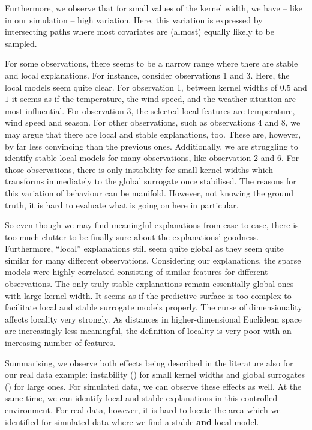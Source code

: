 \documentclass[]{krantz}
\begin{document}
Furthermore, we observe that for small values of the kernel width, we
have -- like in our simulation -- high variation. Here, this variation
is expressed by intersecting paths where most covariates are (almost)
equally likely to be sampled.

For some observations, there seems to be a narrow range where there are
stable and local explanations. For instance, consider observations 1 and
3. Here, the local models seem quite clear. For observation 1, between
kernel widths of \(0.5\) and \(1\) it seems as if the temperature, the
wind speed, and the weather situation are most influential. For
observation 3, the selected local features are temperature, wind speed
and season. For other observations, such as observations 4 and 8, we may
argue that there are local and stable explanations, too. These are,
however, by far less convincing than the previous ones. Additionally, we
are struggling to identify stable local models for many observations,
like observation 2 and 6. For those observations, there is only
instability for small kernel widths which transforms immediately to the
global surrogate once stabilised. The reasons for this variation of
behaviour can be manifold. However, not knowing the ground truth, it is
hard to evaluate what is going on here in particular.

So even though we may find meaningful explanations from case to case,
there is too much clutter to be finally sure about the explanations'
goodness. Furthermore, ``local'' explanations still seem quite global as
they seem quite similar for many different observations. Considering our
explanations, the sparse models were highly correlated consisting of
similar features for different observations. The only truly stable
explanations remain essentially global ones with large kernel width. It
seems as if the predictive surface is too complex to facilitate local
and stable surrogate models properly. The curse of dimensionality
affects locality very strongly. As distances in higher-dimensional
Euclidean space are increasingly less meaningful, the definition of
locality is very poor with an increasing number of features.

Summarising, we observe both effects being described in the literature
also for our real data example: instability
(\citet{alvarez2018robustness}) for small kernel widths and global
surrogates (\citet{laugel2018defining}) for large ones. For simulated
data, we can observe these effects as well. At the same time, we can
identify local and stable explanations in this controlled environment.
For real data, however, it is hard to locate the area which we
identified for simulated data where we find a stable \textbf{and} local
model.
\end{document}
